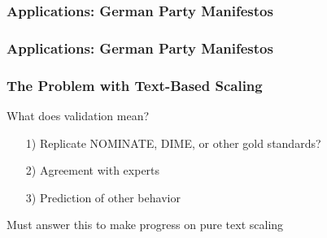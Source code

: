 \documentclass{beamer}
\numberwithin{equation}{section}
\begin{document}
\begin{frame}
\frametitle<1>{Applications: German Party Manifestos}
\frametitle<2>{Applications: German Party Manifestos}




\end{frame}


\begin{frame}
\frametitle{The Problem with Text-Based Scaling}

What does validation mean?
\begin{itemize}
\item[1)] Replicate NOMINATE, DIME, or other gold standards?
\item[2)] Agreement with experts
\item[3)] Prediction of other behavior
\end{itemize}

Must answer this to make progress on pure text scaling


\end{frame}
\end{document}
